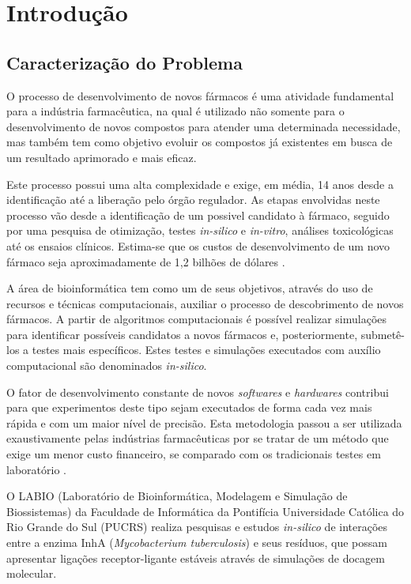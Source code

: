 \chapter{Introdução}
\section{Caracterização do Problema}
O processo de desenvolvimento de novos fármacos é uma atividade fundamental para a indústria farmacêutica, na qual é utilizado não somente para o desenvolvimento de novos compostos para atender uma determinada necessidade, mas também tem como objetivo evoluir os compostos já existentes em busca de um resultado aprimorado e mais eficaz. 

Este processo possui uma alta complexidade e exige, em média, 14 anos desde a identificação até a liberação pelo órgão regulador. As etapas envolvidas neste processo vão desde a identificação de um possivel candidato à fármaco, seguido por uma pesquisa de otimização, testes \emph{in-silico} e \emph{in-vitro}, análises toxicológicas até os ensaios clínicos. Estima-se que os custos de desenvolvimento de um novo fármaco seja aproximadamente de 1,2 bilhões de dólares \cite{kun92}. 

A área de bioinformática tem como um de seus objetivos, através do uso de recursos e técnicas computacionais, auxiliar o processo de descobrimento de novos fármacos. A partir de algoritmos computacionais é possível realizar simulações para identificar possíveis candidatos a novos fármacos e, posteriormente, submetê-los a testes mais específicos. Estes testes e simulações executados com auxílio computacional são denominados \emph{in-silico}.

O fator de desenvolvimento constante de novos \emph{softwares} e \emph{hardwares} contribui para que experimentos deste tipo sejam executados de forma cada vez mais rápida e com um maior nível de precisão. Esta metodologia passou a ser utilizada exaustivamente pelas indústrias farmacêuticas por se tratar de um método que exige um menor custo financeiro, se comparado com os tradicionais testes em laboratório \cite{art08}. 

O LABIO (Laboratório de Bioinformática, Modelagem e Simulação de Biossistemas) da Faculdade de Informática da Pontifícia Universidade 
Católica do Rio Grande do Sul (PUCRS) realiza pesquisas e estudos \emph{in-silico} de interações entre a enzima InhA (\emph{Mycobacterium 
tuberculosis}) e seus resíduos, que possam apresentar ligações receptor-ligante estáveis através de simulações de docagem molecular.

